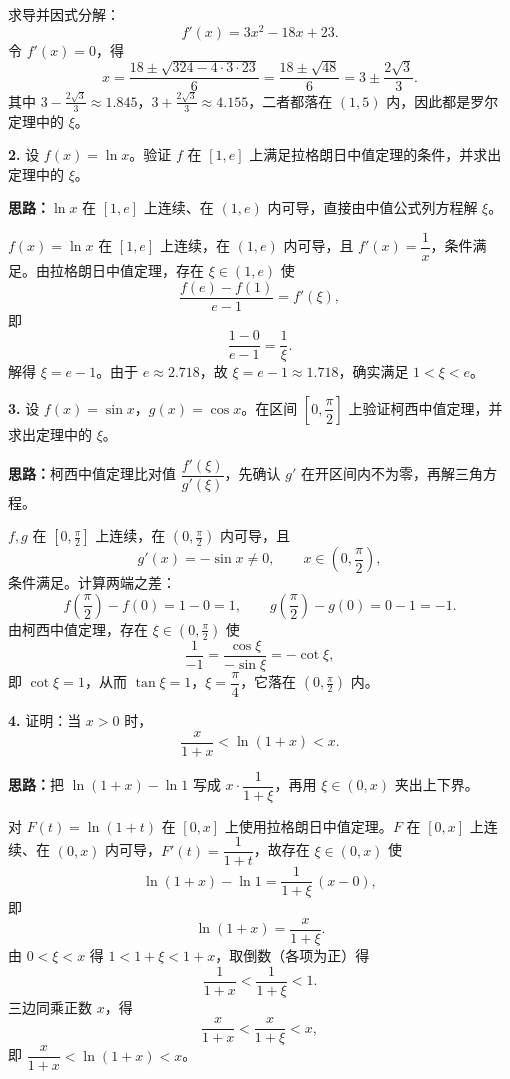 求导并因式分解：
\[
f'(x)=3x^{2}-18x+23.
\]
令 $f'(x)=0$，得
\[
x=\frac{18\pm\sqrt{324-4\cdot 3\cdot 23}}{6}
=\frac{18\pm\sqrt{48}}{6}
=3\pm\frac{2\sqrt3}{3}.
\]
其中 $3-\frac{2\sqrt3}{3}\approx 1.845$，$3+\frac{2\sqrt3}{3}\approx 4.155$，二者都落在 $(1,5)$ 内，因此都是罗尔定理中的 $\xi$。

\else \answerarea[8] \fi%

\textbf{2.} 设 $f(x)=\ln x$。验证 $f$ 在 $[1,e]$ 上满足拉格朗日中值定理的条件，并求出定理中的 $\xi$。

\ifshowsolutions%
\textbf{思路：}$\ln x$ 在 $[1,e]$ 上连续、在 $(1,e)$ 内可导，直接由中值公式列方程解 $\xi$。

$f(x)=\ln x$ 在 $[1,e]$ 上连续，在 $(1,e)$ 内可导，且 $f'(x)=\dfrac1x$，条件满足。由拉格朗日中值定理，存在 $\xi\in(1,e)$ 使
\[
\frac{f(e)-f(1)}{e-1}=f'(\xi),
\]
即
\[
\frac{1-0}{e-1}=\frac1{\xi}.
\]
解得 $\xi=e-1$。由于 $e\approx 2.718$，故 $\xi=e-1\approx 1.718$，确实满足 $1<\xi<e$。

\else \answerarea[8] \fi%

\textbf{3.} 设 $f(x)=\sin x$，$g(x)=\cos x$。在区间 $\left[0,\dfrac{\pi}{2}\right]$ 上验证柯西中值定理，并求出定理中的 $\xi$。

\ifshowsolutions%
\textbf{思路：}柯西中值定理比对值 $\dfrac{f'(\xi)}{g'(\xi)}$，先确认 $g'$ 在开区间内不为零，再解三角方程。

$f,g$ 在 $\left[0,\frac{\pi}{2}\right]$ 上连续，在 $\left(0,\frac{\pi}{2}\right)$ 内可导，且
\[
g'(x)=-\sin x\neq 0,\qquad x\in\left(0,\frac{\pi}{2}\right),
\]
条件满足。计算两端之差：
\[
f\left(\frac{\pi}{2}\right)-f(0)=1-0=1,\qquad
g\left(\frac{\pi}{2}\right)-g(0)=0-1=-1.
\]
由柯西中值定理，存在 $\xi\in\left(0,\frac{\pi}{2}\right)$ 使
\[
\frac{1}{-1}=\frac{\cos\xi}{-\sin\xi}=-\cot\xi,
\]
即 $\cot\xi=1$，从而 $\tan\xi=1$，$\xi=\dfrac{\pi}{4}$，它落在 $\left(0,\frac{\pi}{2}\right)$ 内。

\else \answerarea[8] \fi%

\textbf{4.} 证明：当 $x>0$ 时，
\[
\frac{x}{1+x}<\ln(1+x)<x.
\]

\ifshowsolutions%
\textbf{思路：}把 $\ln(1+x)-\ln 1$ 写成 $x\cdot\dfrac{1}{1+\xi}$，再用 $\xi\in(0,x)$ 夹出上下界。

对 $F(t)=\ln(1+t)$ 在 $[0,x]$ 上使用拉格朗日中值定理。$F$ 在 $[0,x]$ 上连续、在 $(0,x)$ 内可导，$F'(t)=\dfrac{1}{1+t}$，故存在 $\xi\in(0,x)$ 使
\[
\ln(1+x)-\ln 1=\frac{1}{1+\xi}\,(x-0),
\]
即
\[
\ln(1+x)=\frac{x}{1+\xi}.
\]
由 $0<\xi<x$ 得 $1<1+\xi<1+x$，取倒数（各项为正）得
\[
\frac{1}{1+x}<\frac{1}{1+\xi}<1.
\]
三边同乘正数 $x$，得
\[
\frac{x}{1+x}<\frac{x}{1+\xi}<x,
\]
即 $\dfrac{x}{1+x}<\ln(1+x)<x$。


